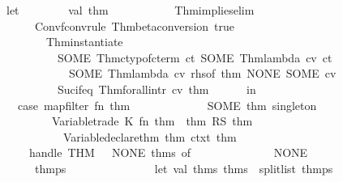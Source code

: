 \begin{isabellebody}
\ \ \ \ \ \ let\isanewline
\ \ \ \ \ \ \ \ val\ thm{\isacharprime}\ {\isacharequal}\isanewline
\ \ \ \ \ \ \ \ \ \ Thm{\isachardot}implies{\isacharunderscore}elim\isanewline
\ \ \ \ \ \ \ \ \ \ \ {\isacharparenleft}Conv{\isachardot}fconv{\isacharunderscore}rule\ {\isacharparenleft}Thm{\isachardot}beta{\isacharunderscore}conversion\ true{\isacharparenright}\isanewline
\ \ \ \ \ \ \ \ \ \ \ \ \ {\isacharparenleft}Thm{\isachardot}instantiate{\isacharprime}\isanewline
\ \ \ \ \ \ \ \ \ \ \ \ \ \ \ {\isacharbrackleft}SOME\ {\isacharparenleft}Thm{\isachardot}ctyp{\isacharunderscore}of{\isacharunderscore}cterm\ ct{\isacharparenright}{\isacharbrackright}\ {\isacharbrackleft}SOME\ {\isacharparenleft}Thm{\isachardot}lambda\ cv\ ct{\isacharparenright}{\isacharcomma}\isanewline
\ \ \ \ \ \ \ \ \ \ \ \ \ \ \ \ \ SOME\ {\isacharparenleft}Thm{\isachardot}lambda\ cv{\isacharprime}\ {\isacharparenleft}rhs{\isacharunderscore}of\ thm{\isacharparenright}{\isacharparenright}{\isacharcomma}\ NONE{\isacharcomma}\ SOME\ cv{\isacharprime}{\isacharbrackright}\isanewline
\ \ \ \ \ \ \ \ \ \ \ \ \ \ \ Suc{\isacharunderscore}if{\isacharunderscore}eq{\isacharparenright}{\isacharparenright}\ {\isacharparenleft}Thm{\isachardot}forall{\isacharunderscore}intr\ cv{\isacharprime}\ thm{\isacharparenright}\isanewline
\ \ \ \ \ \ in\isanewline
\ \ \ \ \ \ \ \ case\ map{\isacharunderscore}filter\ {\isacharparenleft}fn\ thm{\isacharprime}{\isacharprime}\ {\isacharequal}{\isachargreater}\isanewline
\ \ \ \ \ \ \ \ \ \ \ \ SOME\ {\isacharparenleft}thm{\isacharprime}{\isacharprime}{\isacharcomma}\ singleton\isanewline
\ \ \ \ \ \ \ \ \ \ \ \ \ \ {\isacharparenleft}Variable{\isachardot}trade\ {\isacharparenleft}K\ {\isacharparenleft}fn\ {\isacharbrackleft}thm{\isacharprime}{\isacharprime}{\isacharprime}{\isacharbrackright}\ {\isacharequal}{\isachargreater}\ {\isacharbrackleft}thm{\isacharprime}{\isacharprime}{\isacharprime}\ RS\ thm{\isacharprime}{\isacharbrackright}{\isacharparenright}{\isacharparenright}\isanewline
\ \ \ \ \ \ \ \ \ \ \ \ \ \ \ \ {\isacharparenleft}Variable{\isachardot}declare{\isacharunderscore}thm\ thm{\isacharprime}{\isacharprime}\ ctxt{\isacharparenright}{\isacharparenright}\ thm{\isacharprime}{\isacharprime}{\isacharparenright}\isanewline
\ \ \ \ \ \ \ \ \ \ handle\ THM\ {\isacharunderscore}\ {\isacharequal}{\isachargreater}\ NONE{\isacharparenright}\ thms\ of\isanewline
\ \ \ \ \ \ \ \ \ \ \ \ {\isacharbrackleft}{\isacharbrackright}\ {\isacharequal}{\isachargreater}\ NONE\isanewline
\ \ \ \ \ \ \ \ \ \ {\isacharbar}\ thmps\ {\isacharequal}{\isachargreater}\isanewline
\ \ \ \ \ \ \ \ \ \ \ \ \ \ let\ val\ {\isacharparenleft}thms{}{\isacharcomma}\ thms{}{\isacharparenright}\ {\isacharequal}\ split{\isacharunderscore}list\ thmps\isanewline

\end{isabellebody}
